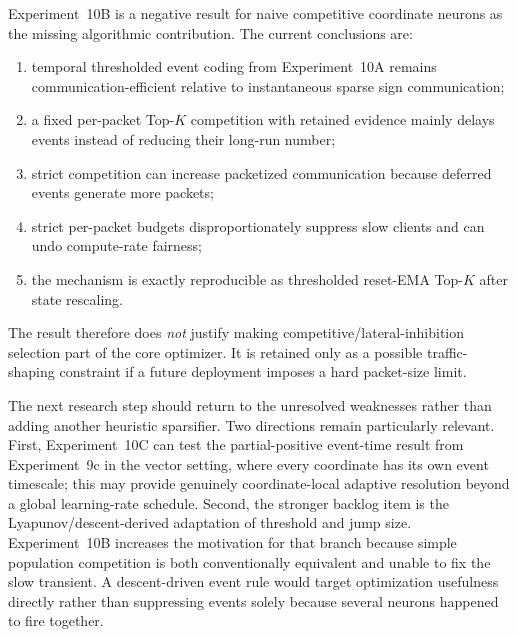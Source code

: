 Experiment~10B is a negative result for naive competitive coordinate neurons as the missing algorithmic contribution. The current conclusions are:
\begin{enumerate}
  \item temporal thresholded event coding from Experiment~10A remains communication-efficient relative to instantaneous sparse sign communication;
  \item a fixed per-packet Top-$K$ competition with retained evidence mainly delays events instead of reducing their long-run number;
  \item strict competition can increase packetized communication because deferred events generate more packets;
  \item strict per-packet budgets disproportionately suppress slow clients and can undo compute-rate fairness;
  \item the mechanism is exactly reproducible as thresholded reset-EMA Top-$K$ after state rescaling.
\end{enumerate}

The result therefore does \emph{not} justify making competitive/lateral-inhibition selection part of the core optimizer. It is retained only as a possible traffic-shaping constraint if a future deployment imposes a hard packet-size limit.

The next research step should return to the unresolved weaknesses rather than adding another heuristic sparsifier. Two directions remain particularly relevant. First, Experiment~10C can test the partial-positive event-time result from Experiment~9c in the vector setting, where every coordinate has its own event timescale; this may provide genuinely coordinate-local adaptive resolution beyond a global learning-rate schedule. Second, the stronger backlog item is the Lyapunov/descent-derived adaptation of threshold and jump size. Experiment~10B increases the motivation for that branch because simple population competition is both conventionally equivalent and unable to fix the slow transient. A descent-driven event rule would target optimization usefulness directly rather than suppressing events solely because several neurons happened to fire together.
